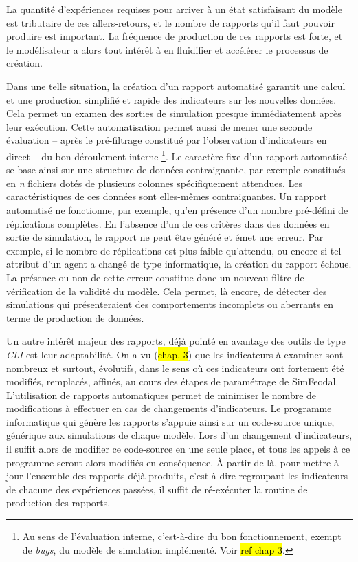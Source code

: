 La quantité d'expériences requises pour arriver à un état satisfaisant du modèle est tributaire de ces allers-retours, et le nombre de rapports qu'il faut pouvoir produire est important.
La fréquence de production de ces rapports est forte, et le modélisateur a alors tout intérêt à en fluidifier et accélérer le processus de création.

Dans une telle situation, la création d'un rapport automatisé garantit une calcul et une production simplifié et rapide des indicateurs sur les nouvelles données.
Cela permet un examen des sorties de simulation presque immédiatement après leur exécution.
Cette automatisation permet aussi de mener une seconde évaluation -- après le pré-filtrage constitué par l'observation d'indicateurs en direct -- du bon déroulement \og interne \fg{}\footnote{
	Au sens de l'évaluation interne, c'est-à-dire du bon fonctionnement, exempt de \textit{bugs}, du modèle de simulation implémenté.
	Voir \hl{ref chap 3}.
}.
Le caractère fixe d'un rapport automatisé se base ainsi sur une structure de données contraignante, par exemple constitués en \textit{n} fichiers dotés de plusieurs colonnes spécifiquement attendues.
Les caractéristiques de ces données sont elles-mêmes contraignantes.
Un rapport automatisé ne fonctionne, par exemple, qu'en présence d'un nombre pré-défini de réplications complètes.
En l'absence d'un de ces critères dans des données en sortie de simulation, le rapport ne peut être généré et émet une erreur.
Par exemple, si le nombre de réplications est plus faible qu'attendu, ou encore si tel attribut d'un agent a changé de type informatique, la création du rapport échoue.
La présence ou non de cette erreur constitue donc un nouveau filtre de vérification de la validité du modèle.
Cela permet, là encore, de détecter des simulations qui présenteraient des comportements incomplets ou aberrants en terme de production de données.

Un autre intérêt majeur des rapports, déjà pointé en avantage des outils de type \textit{CLI} est leur adaptabilité.
On a vu (\hl{chap. 3}) que les indicateurs à examiner sont nombreux et surtout, évolutifs, dans le sens où ces indicateurs ont fortement été modifiés, remplacés, affinés, au cours des étapes de paramétrage de SimFeodal.
L'utilisation de rapports automatiques permet de minimiser le nombre de modifications à effectuer en cas de changements d'indicateurs.
Le programme informatique qui génère les rapports s'appuie ainsi sur un code-source unique, générique aux simulations de chaque modèle.
Lors d'un changement d'indicateurs, il suffit alors de modifier ce code-source en une seule place, et tous les appels à ce programme seront alors modifiés en conséquence.
À partir de là, pour mettre à jour l'ensemble des rapports déjà produits, c'est-à-dire regroupant les indicateurs de chacune des expériences passées, il suffit de ré-exécuter la routine de production des rapports.

